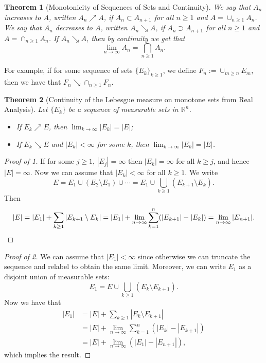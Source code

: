 \documentclass[12pt,reqno]{article}
\renewcommand{\emph}[1]{\textit{#1}}
\theoremstyle{plain}
\newtheorem{theorem}{Theorem}[section]
\theoremstyle{definition}
\begin{document}
\begin{theorem}[Monotonicity of Sequences of Sets and Continuity]
We say that \emph{$A_n$ increases to $A$}, written $A_n \nearrow A$, if 
$A_n \subset A_{n+1}$ for all $n \geq 1$ and $A = \cup_{n \geq 1} A_n$. 
We say that \emph{$A_n$ decreases to $A$}, written $A_n \searrow A$, 
if $A_n \supset A_{n+1}$ for all $n \geq 1$ and $A = \cap_{n \geq 1} A_n$. 
If $A_n \searrow A$, then by continuity we get that 
\[
\lim_{n \rightarrow \infty} A_n = \bigcap_{n \geq 1} A_n. 
\]
\end{theorem} 

For example, if for some sequence of sets $\{E_k\}_{k \geq 1}$, we define 
$F_n := \cup_{m \geq n} E_m$, then we have that $F_n \searrow \cap_{n \geq 1} F_n$. 

\begin{theorem}[Continuity of the Lebesgue measure on monotone sets from Real Analysis]
Let $\{E_k\}$ be a sequence of measurable sets in $\mathbb{R}^n$. 
\begin{itemize} 
\item[(1)] If $E_k \nearrow E$, then $\lim_{k \rightarrow \infty} |E_k| = |E|$; 
\item[(2)] If $E_k \searrow E$ and $|E_k| < \infty$ for some $k$, then 
     $\lim_{k \rightarrow \infty} |E_k| = |E|$. 
\end{itemize} 
\end{theorem} 
\begin{proof}[Proof of 1]
If for some $j \geq 1$, $|E_j| = \infty$ then $|E_k| = \infty$ for all $k \geq j$, and hence 
$|E| = \infty$. Now we can assume that $|E_k| < \infty$ for all $k \geq 1$. 
We write 
\[
E = E_1 \cup (E_2 \setminus E_1) \cup \cdots = E_1 \cup \bigcup_{k \geq 1} (E_{k+1} \setminus E_k). 
\]
Then 
\[
|E| = |E_1| + \sum_{k \geq 1} |E_{k+1} \setminus E_k| = |E_1| + \lim_{n \rightarrow \infty} 
     \sum_{k=1}^n (|E_{k+1}| - |E_k|) = \lim_{n \rightarrow \infty} |E_{n+1}|. 
     \qedhere
\]
\end{proof} 
\begin{proof}[Proof of 2]
We can assume that $|E_1| < \infty$ since otherwise we can truncate the sequence and relabel to 
obtain the same limit. Moreover, we can write $E_1$ as a disjoint union of 
measurable sets: 
\[
E_1 = E \cup \bigcup_{k \geq 1} (E_k \setminus E_{k+1}). 
\]
Now we have that 
\begin{align*} 
|E_1| & = |E| + \sum_{k \geq 1} |E_k \setminus E_{k+1}| \\ 
     & = |E| + \lim_{n \rightarrow \infty} \sum_{k=1}^n (|E_k|-|E_{k+1}|) \\ 
     & = |E| + \lim_{n \rightarrow \infty} (|E_1| - |E_{n+1}|), 
\end{align*} 
which implies the result. 
\end{proof} 
\end{document}

